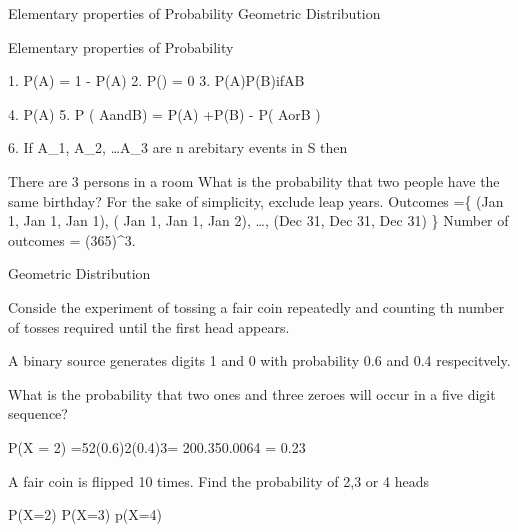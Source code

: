 Elementary properties of Probability
Geometric Distribution
 
Elementary properties of Probability
 
  1. P(A) = 1 - P(A)
2. P() = 0
3. P(A)P(B)ifAB
 
4. P(A) 
5.
P ( AandB) = P(A) +P(B) - P( AorB )
 
6. If A_1, A_2, \ldots A_3  are n arebitary events in S then
 
 
There are 3 persons in a room
What is the probability that two people have the same birthday?
For the sake of simplicity, exclude leap years.
Outcomes =\{ (Jan 1, Jan 1, Jan 1), ( Jan 1, Jan 1, Jan 2), \ldots , (Dec 31, Dec 31, Dec 31) \}
Number of outcomes = (365)^3.
 
Geometric Distribution
 
Conside the experiment of tossing a fair coin repeatedly and counting th number of tosses required until the first head appears.
 
 
A binary source generates digits 1 and 0 with probability  0.6 and 0.4 respecitvely.
 
What is the probability that two ones and three zeroes will occur in a five digit sequence?
 
 
P(X = 2) =52(0.6)2(0.4)3= 200.350.0064 = 0.23
 
 
A fair coin is flipped 10 times. Find the probability of 2,3 or 4 heads
 
P(X=2)
P(X=3)
p(X=4)
 
